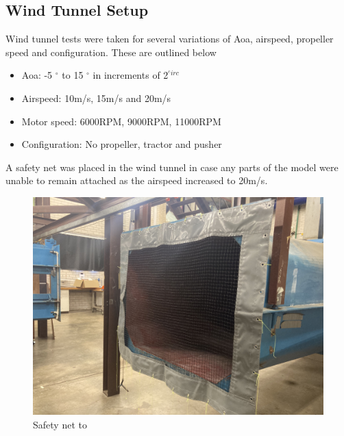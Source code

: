 \subsection{Wind Tunnel Setup}

Wind tunnel tests were taken for several variations of Aoa, airspeed, propeller speed and configuration. These are outlined below

\begin{itemize}
    \item Aoa: -5 $^{\circ}$ to 15 $^{\circ}$ in increments of 2$^{^circ}$
    \item Airspeed: 10m/s, 15m/s and 20m/s
    \item Motor speed: 6000RPM, 9000RPM, 11000RPM
    \item Configuration: No propeller, tractor and pusher
\end{itemize}

A safety net was placed in the wind tunnel in case any parts of the model were unable to remain attached as the airspeed increased to 20m/s.

\begin{figure}
    \centering
    \includegraphics[scale =0.1]{04_Methodology/Figs/windTunnelNet.jpg}
    \caption{Safety net to }
    \label{fig:windTunnelNet}
\end{figure}

